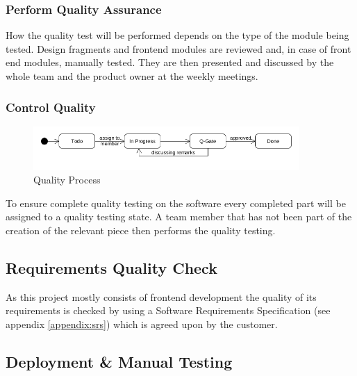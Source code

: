 \subsubsection{Perform Quality Assurance}
\label{ssec:perform_quality}

How the quality test will be performed depends on the type of the module being tested.
\newline
Design fragments and frontend modules are reviewed and, in case of front end modules, manually tested. They are then presented and discussed by the whole team and the product owner at the weekly meetings.

\subsubsection{Control Quality}
\label{ssec:control_quality}

\begin{figure}[H]
    \begin{center}
        \includegraphics[width=0.9\textwidth]{images/state-quality.png}
        \caption{Quality Process}
        \label{fig:quality_process}
    \end{center}
\end{figure}

To ensure complete quality testing on the software every completed part will be assigned to a quality testing state. A team member that has not been part of the creation of the relevant piece then performs the quality testing.

\subsection{Requirements Quality Check}
\label{ssec:requirements_quality_check}

As this project mostly consists of frontend development the quality of its requirements is checked by using a Software Requirements Specification (see appendix \ref{appendix:srs}) which is agreed upon by the customer.

\subsection{Deployment \& Manual Testing}
\label{ssec:deployment_manual_testing}

